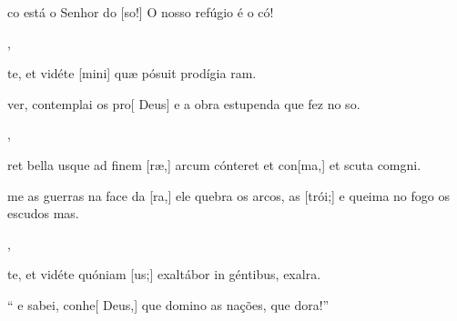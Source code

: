 {    {\item {}co está o Senhor do [so!] O nosso refúgio é o có!~\Antiphona},
  {\item {}te, et vidéte [mini] quæ pósuit prodígia ram.~\Antiphona}%
    {\item {} ver, contemplai os pro[ Deus] e a obra estupenda que fez no so.~\Antiphona},
  {\item {}ret bella usque ad finem [ræ,] arcum cónteret et con[ma,] et scuta comgni.~\Antiphona}%
    {\item {}me as guerras na face da [ra,] ele quebra os arcos, as [trói;] e queima no fogo os escudos mas.~\Antiphona},
  {\item {}te, et vidéte quóniam [us;] exaltábor in géntibus, exalra.~\Antiphona}%
    {\item {}“ e sabei, conhe[ Deus,] que domino as nações, que dora!”~\Antiphona}
}